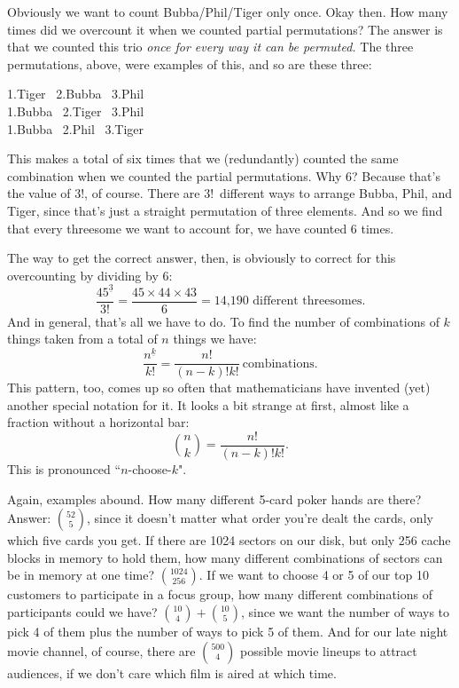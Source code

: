 Obviously we want to count Bubba/Phil/Tiger only once. Okay then. How many
times did we overcount it when we counted partial permutations? The answer
is that we counted this trio \textit{once for every way it can be
permuted.} The three permutations, above, were examples of this, and so are
these three:
\begin{center}
1.Tiger \ 2.Bubba \ 3.Phil \\
1.Bubba \ 2.Tiger \ 3.Phil \\
1.Bubba \ 2.Phil \ 3.Tiger 
\end{center}
This makes a total of six times that we (redundantly) counted the same
combination when we counted the partial permutations. Why 6? Because that's
the value of 3!, of course. There are 3!~different ways to arrange Bubba,
Phil, and Tiger, since that's just a straight permutation of three
elements. And so we find that every threesome we want to account for, we
have counted 6 times.

The way to get the correct answer, then, is obviously to correct for this
overcounting by dividing by 6:
\[
\dfrac{45^{\underline{3}}}{3!} = \dfrac{45 \times 44 \times 43}{6} =
\text{14,190 different threesomes}.
\]
And in general, that's all we have to do. To find the number of
combinations of $k$ things taken from a total of $n$ things we have:
\[
\dfrac{n^{\underline{k}}}{k!} = \dfrac{n!}{(n-k)!k!}\ \text{combinations}.
\]
This pattern, too, comes up so often that mathematicians have invented
(yet) another special notation for it. It looks a bit strange at first,
almost like a fraction without a horizontal bar:
\[
\binom{n}{k} = \dfrac{n!}{(n-k)!k!}.
\]
This is pronounced ``$n$-choose-$k$".

Again, examples abound. How many different 5-card poker hands are there?
Answer: $\binom{52}{5}$, since it doesn't matter what order you're dealt
the cards, only which five cards you get. If there are 1024 sectors on our
disk, but only 256 cache blocks in memory to hold them, how many different
combinations of sectors can be in memory at one time? $\binom{1024}{256}$.
If we want to choose 4 or 5 of our top 10 customers to participate in a
focus group, how many different combinations of participants could we have?
$\binom{10}{4}+\binom{10}{5}$, since we want the number of ways to pick 4
of them plus the number of ways to pick 5 of them. And for our late night
movie channel, of course, there are $\binom{500}{4}$ possible movie lineups
to attract audiences, if we don't care which film is aired at which time.


